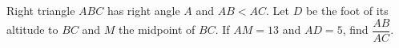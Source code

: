 Right triangle $ABC$ has right angle $A$ and $AB<AC$. Let $D$ be the foot of its altitude to $BC$ and $M$ the midpoint of $BC$. If $AM=13$ and $AD=5$, find $\dfrac{AB}{AC}$.

